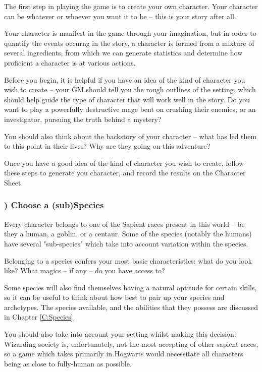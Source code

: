 \newcommand\itemlist{\stepcounter{itemlist} \theitemlist)}



The first step in playing the game is to create your own character. Your character can be whatever or whoever you want it to be -- this is your story after all. 

Your character is manifest in the game through your imagination, but in order to quantify the events occurng in the story, a character is formed from a mixture of several ingredients, from which we can generate statistics and determine how proficient a character is at various actions. 

Before you begin, it is helpful if you have an idea of the kind of character you wish to create -- your GM should tell you the rough outlines of the setting, which should help guide the type of character that will work well in the story. Do you want to play a powerfully destructive mage bent on crushing their enemies; or an investigator, pursuing the truth behind a mystery? 

You should also think about the backstory of your character -- what has led them to this point in their lives? Why are they going on this adventure?  

Once you have a good idea of the kind of character you wish to create, follow these steps to generate you character, and record the results on the Character Sheet.

\subsubsection*{\itemlist{} Choose a (sub)Species}

Every character belongs to one of the Sapient races present in this world -- be they a human, a goblin, or a centaur. Some of the species (notably the humans) have several "sub-species" which take into account variation within the species. 

Belonging to a species confers your most basic characteristics: what do you look like? What magics -- if any -- do you have access to? 

Some species will also find themselves having a natural aptitude for certain skills, so it can be useful to think about how best to pair up your species and archetypes. The species available, and the abilities that they possess are discussed in Chapter \ref{C:Species}

You should also take into account your setting whilst making this decision: Wizarding society is, unfortunately, not the most accepting of other sapient races, so a game which takes primarily in Hogwarts would necessitate all characters being as close to fully-human as possible.  


